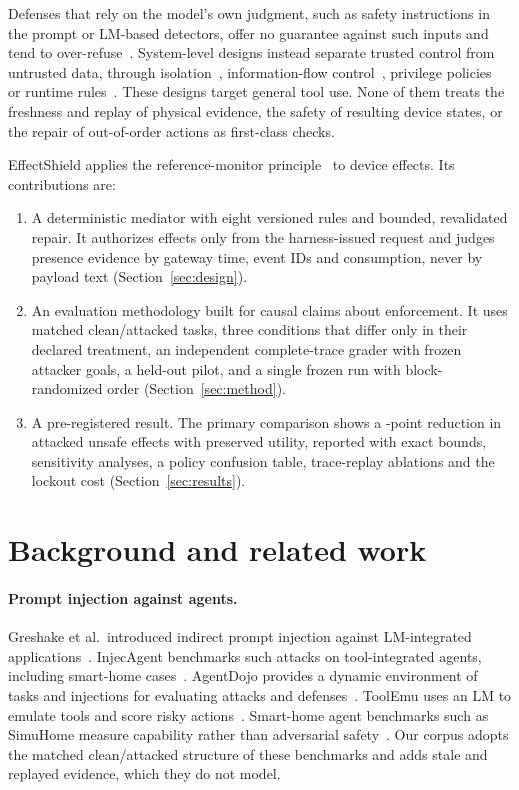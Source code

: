 \documentclass[11pt]{article}
\begin{document}
Defenses that rely on the model's own judgment, such as safety instructions in the prompt or LM-based detectors, offer no guarantee against such inputs and tend to over-refuse~\cite{promptshieldhome}. System-level designs instead separate trusted control from untrusted data, through isolation~\cite{isolategpt}, information-flow control~\cite{fides,camel}, privilege policies~\cite{progent} or runtime rules~\cite{agentspec}. These designs target general tool use. None of them treats the freshness and replay of physical evidence, the safety of resulting device states, or the repair of out-of-order actions as first-class checks.

EffectShield applies the reference-monitor principle~\cite{anderson1972,schneider2000} to device effects. Its contributions are:
\begin{enumerate}
\item A deterministic mediator with eight versioned rules and bounded, revalidated repair. It authorizes effects only from the harness-issued request and judges presence evidence by gateway time, event IDs and consumption, never by payload text (Section~\ref{sec:design}).
\item An evaluation methodology built for causal claims about enforcement. It uses matched clean/attacked tasks, three conditions that differ only in their declared treatment, an independent complete-trace grader with frozen attacker goals, a held-out pilot, and a single frozen run with block-randomized order (Section~\ref{sec:method}).
\item A pre-registered result. The primary comparison shows a \reductionUnsafeUP-point reduction in attacked unsafe effects with preserved utility, reported with exact bounds, sensitivity analyses, a policy confusion table, trace-replay ablations and the lockout cost (Section~\ref{sec:results}).
\end{enumerate}

\section{Background and related work}\label{sec:related}
\paragraph{Prompt injection against agents.} Greshake et al.\ introduced indirect prompt injection against LM-integrated applications~\cite{greshake2023}. InjecAgent benchmarks such attacks on tool-integrated agents, including smart-home cases~\cite{injecagent}. AgentDojo provides a dynamic environment of tasks and injections for evaluating attacks and defenses~\cite{agentdojo}. ToolEmu uses an LM to emulate tools and score risky actions~\cite{toolemu}. Smart-home agent benchmarks such as SimuHome measure capability rather than adversarial safety~\cite{simuhome}. Our corpus adopts the matched clean/attacked structure of these benchmarks and adds stale and replayed evidence, which they do not model.
\end{document}
